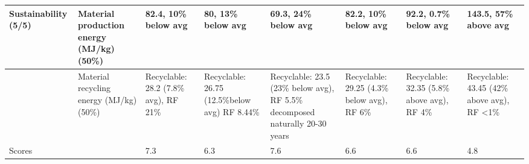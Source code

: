 \begin{table}[h]
{\begin{scriptsize}
\begin{tabular}{|p{2cm}|p{2cm}|p{1.5cm}|p{1.4cm}|p{1.4cm}|p{1.7cm}|p{1.5cm}|p{1.5cm}|}
Sustainability (5/5)        & Material production energy (MJ/kg) (50\%) & \cellcolor[HTML]{DDEBF7}82.4, 10\% below avg                  & \cellcolor[HTML]{DDEBF7}80, 13\% below avg                            & \cellcolor[HTML]{E2EFDA}69.3, 24\% below avg                                                          & \cellcolor[HTML]{DDEBF7}82.2, 10\% below avg                         & \cellcolor[HTML]{DDEBF7}92.2, 0.7\% below avg                        & \cellcolor[HTML]{FFF2CC}143.5, 57\% above avg                                 \\ \hline
                            & Material recycling energy (MJ/kg) (50\%)  & \cellcolor[HTML]{E2EFDA}Recyclable: 28.2 (7.8\% avg), RF 21\% & \cellcolor[HTML]{E2EFDA}Recyclable: 26.75 (12.5\%below avg) RF 8.44\% & \cellcolor[HTML]{E2EFDA}Recyclable: 23.5 (23\% below avg),  RF 5.5\% decomposed naturally 20-30 years & \cellcolor[HTML]{DDEBF7}Recyclable: 29.25 (4.3\% below avg),  RF 6\% & \cellcolor[HTML]{DDEBF7}Recyclable: 32.35 (5.8\% above avg),  RF 4\% & \cellcolor[HTML]{FFF2CC}Recyclable: 43.45 (42\% above avg), RF \textless{}1\% \\ \hline
Scores                      &                                           & 7.3                                                           & 6.3                                                                   & 7.6                                                                                                   & 6.6                                                                  & 6.6                                                                  & 4.8                                                                           \\ \hline
\end{tabular}%

\end{scriptsize}
}
\end{table}


